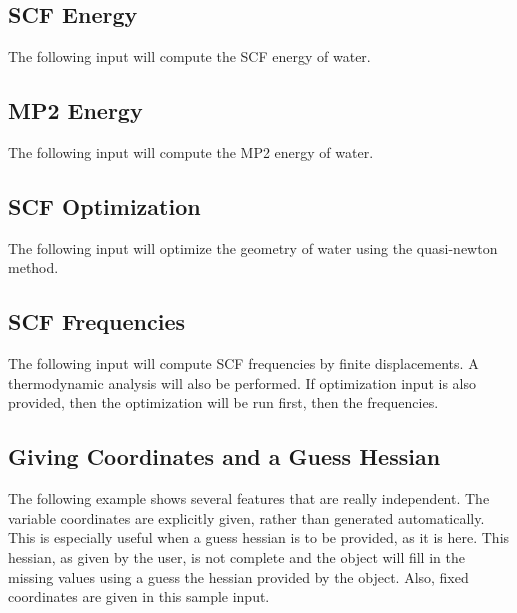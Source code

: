 \subsection{SCF Energy}

The following input will compute the SCF energy of water.



\subsection{MP2 Energy}

The following input will compute the MP2 energy of water.



\subsection{SCF Optimization}

The following input will optimize the geometry of water using
the quasi-newton method.



\subsection{SCF Frequencies}

The following input will compute SCF frequencies by finite
displacements.  A thermodynamic analysis will also be
performed.  If optimization input is also provided, then the
optimization will be run first, then the frequencies.



\subsection{Giving Coordinates and a Guess Hessian}

The following example shows several features that are really independent.
The variable coordinates are explicitly given, rather than generated
automatically.  This is especially useful when a guess hessian is to be
provided, as it is here.  This hessian, as given by the user, is not
complete and the  object will fill in the missing
values using a guess the hessian provided by the 
object.  Also, fixed coordinates are given in this sample input.

